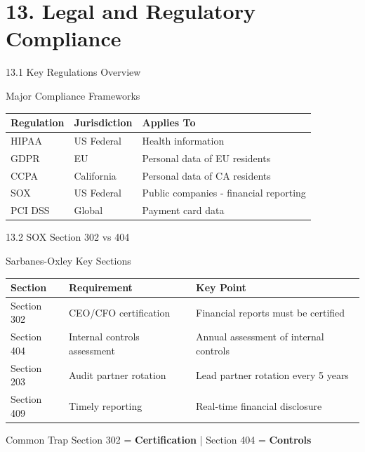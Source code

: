 \documentclass{beamer}
\begin{document}
	\section{13. Legal and Regulatory Compliance}
	
	\begin{frame}{13.1 Key Regulations Overview}
		\begin{block}{Major Compliance Frameworks}
			\begin{tabular}{|p{2.5cm}|p{4cm}|p{4.5cm}|}
				\hline
				\textbf{Regulation} & \textbf{Jurisdiction} & \textbf{Applies To} \\
				\hline
				HIPAA & US Federal & Health information \\
				\hline
				GDPR & EU & Personal data of EU residents \\
				\hline
				CCPA & California & Personal data of CA residents \\
				\hline
				SOX & US Federal & Public companies - financial reporting \\
				\hline
				PCI DSS & Global & Payment card data \\
				\hline
			\end{tabular}
		\end{block}
	\end{frame}
	
	\begin{frame}{13.2 SOX Section 302 vs 404}
		\begin{block}{Sarbanes-Oxley Key Sections}
			\begin{tabular}{|p{2.5cm}|p{4cm}|p{4.5cm}|}
				\hline
				\textbf{Section} & \textbf{Requirement} & \textbf{Key Point} \\
				\hline
				Section 302 & CEO/CFO certification & Financial reports must be certified \\
				\hline
				Section 404 & Internal controls assessment & Annual assessment of internal controls \\
				\hline
				Section 203 & Audit partner rotation & Lead partner rotation every 5 years \\
				\hline
				Section 409 & Timely reporting & Real-time financial disclosure \\
				\hline
			\end{tabular}
		\end{block}
		
		\begin{alertblock}{Common Trap}
			Section 302 = \textbf{Certification} | Section 404 = \textbf{Controls}
		\end{alertblock}
	\end{frame}
	
\end{document}
